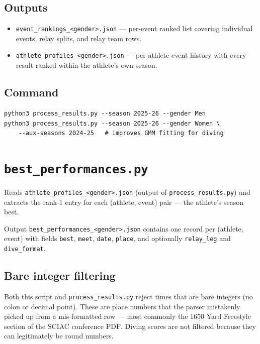 \documentclass{article}
\begin{document}
\subsection{Outputs}

\begin{itemize}[noitemsep]
  \item \texttt{event\_rankings\_<gender>.json} --- per-event ranked list
        covering individual events, relay splits, and relay team rows.
  \item \texttt{athlete\_profiles\_<gender>.json} --- per-athlete event history
        with every result ranked within the athlete's own season.
\end{itemize}

\subsection{Command}
\begin{lstlisting}
python3 process_results.py --season 2025-26 --gender Men
python3 process_results.py --season 2025-26 --gender Women \
    --aux-seasons 2024-25   # improves GMM fitting for diving
\end{lstlisting}

\section{\texttt{best\_performances.py}}

Reads \texttt{athlete\_profiles\_<gender>.json} (output of
\texttt{process\_results.py}) and extracts the rank-1 entry for each
(athlete, event) pair --- the athlete's season best.

Output \texttt{best\_performances\_<gender>.json} contains one record per
(athlete, event) with fields \texttt{best}, \texttt{meet}, \texttt{date},
\texttt{place}, and optionally \texttt{relay\_leg} and \texttt{dive\_format}.

\subsection*{Bare integer filtering}

Both this script and \texttt{process\_results.py} reject times that are bare
integers (no colon or decimal point). These are place numbers that the parser
mistakenly picked up from a mis-formatted row --- most commonly the 1650 Yard
Freestyle section of the SCIAC conference PDF. Diving scores are not filtered
because they can legitimately be round numbers.
\end{document}
